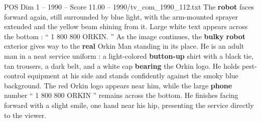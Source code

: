 \begin{textsample}{POS Dim 1 – 1990 – Score 11.00 – 1990/tv\_com\_1990\_112.txt}
The \textbf{robot} faces forward again, still surrounded by blue light, with the arm-mounted sprayer extended and the yellow beam shining from it.
Large white text appears across the bottom : “ 1 800 800 ORKIN. ” As the image continues, the \textbf{bulky} \textbf{robot} exterior gives way to the \textbf{real} Orkin Man standing in its place.
He is an adult man in a neat service uniform : a light-colored \textbf{button-up} shirt with a black tie, tan trousers, a dark belt, and a white cap \textbf{bearing} the Orkin logo.
He holds pest-control equipment at his side and stands confidently against the smoky blue background.
The red Orkin logo appears near him, while the large \textbf{phone} number “ 1 800 800 ORKIN ” remains across the bottom.
He finishes facing forward with a slight smile, one hand near his hip, presenting the service directly to the viewer.

\end{textsample}
